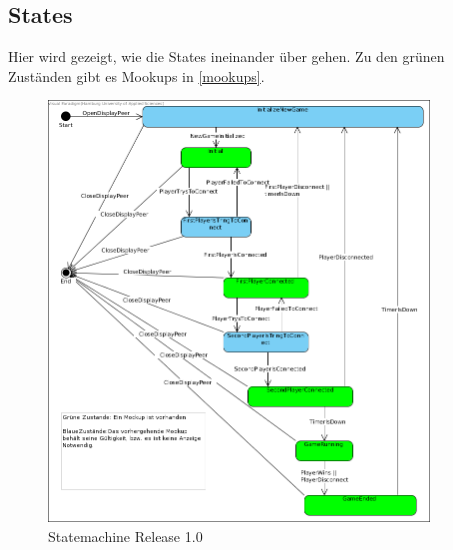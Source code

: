 	\subsection{States} \label{states}
		Hier wird gezeigt, wie die States ineinander über gehen. Zu den grünen Zuständen gibt es Mookups in \ref{mookups}.
		\begin{figure}[!htb]
			\centering
			\includegraphics[width=0.9\textwidth]{architecture/StateMachineRelease1.0.png}
			\caption{Statemachine Release 1.0}
			\label{Statemachine Release 1.0}
		\end{figure}
